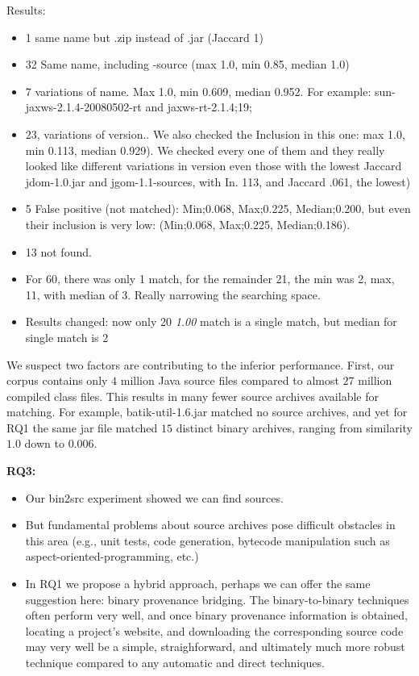 Results:

\begin{itemize}
\item 1 same name but .zip instead of .jar (Jaccard 1)
\item 32 Same name, including -source (max 1.0, min 0.85, median 1.0)
\item 7 variations of name. Max 1.0, min 0.609, median 0.952. For
  example: sun-jaxws-2.1.4-20080502-rt and jaxws-rt-2.1.4;19;
\item 23, variations of version.. We also checked the Inclusion in
  this one: max 1.0, min 0.113, median 0.929). We checked every one
  of them and they really looked like different variations in version
  even those with the lowest Jaccard jdom-1.0.jar and
  jgom-1.1-sources, with In. 113, and Jaccard .061, the lowest)
\item 5 False positive (not matched): Min;0.068, Max;0.225,
  Median;0.200, but even their inclusion is very  low: (Min;0.068,
  Max;0.225, Median;0.186).
\item 13 not found. 
\item For 60, there was only 1 match, for the remainder 21, the min was 2, max, 11, with median of 3. Really narrowing the searching space.
\item Results changed: now only 20 \emph{1.00} match is a single match, but median for single match is 2
\end{itemize}


We suspect two factors are contributing to the inferior performance.
First, our corpus contains only $4$ million Java source files compared
to almost $27$ million compiled class files.  This results in many fewer
source archives available for matching.  For example, batik-util-1.6.jar
matched no source archives, and yet for RQ1 the same jar file matched
$15$ distinct binary archives, ranging from similarity $1.0$ down to
$0.006$.


\begin{hassanbox}
\textbf{RQ3:}  

\begin{itemize}

\item Our bin2src experiment showed we can find sources.

\item But fundamental problems about source archives pose difficult obstacles in this area
      (e.g., unit tests, code generation, bytecode manipulation such as aspect-oriented-programming, etc.)

\item In RQ1 we propose a hybrid approach, perhaps we can offer the same suggestion here:
      binary provenance bridging.  The binary-to-binary techniques often perform very well,
      and once binary provenance information is obtained, locating a project's website, and downloading
      the corresponding source code may very well be a simple, straighforward, and ultimately
      much more robust technique compared
      to any automatic and direct techniques.
      
\end{itemize}

\end{hassanbox}


